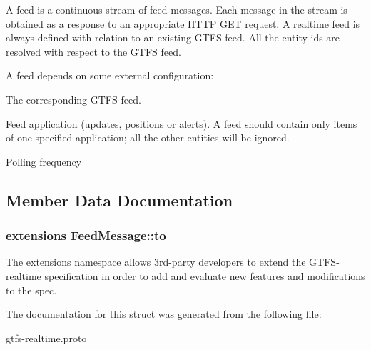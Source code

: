 A feed is a continuous stream of feed messages. Each message in the stream is obtained as a response to an appropriate H\+T\+TP G\+ET request. A realtime feed is always defined with relation to an existing G\+T\+FS feed. All the entity ids are resolved with respect to the G\+T\+FS feed.

A feed depends on some external configuration\+:
\begin{DoxyItemize}
\item The corresponding G\+T\+FS feed.
\item Feed application (updates, positions or alerts). A feed should contain only items of one specified application; all the other entities will be ignored.
\item Polling frequency 
\end{DoxyItemize}

\subsection{Member Data Documentation}
\subsubsection[{\texorpdfstring{to}{to}}]{\setlength{\rightskip}{0pt plus 5cm}extensions Feed\+Message\+::to}\hypertarget{structFeedMessage_a0c9c34fa06eec947bf51cf8b8d1ee0df}{}\label{structFeedMessage_a0c9c34fa06eec947bf51cf8b8d1ee0df}


The extensions namespace allows 3rd-\/party developers to extend the G\+T\+F\+S-\/realtime specification in order to add and evaluate new features and modifications to the spec. 



The documentation for this struct was generated from the following file\+:\begin{DoxyCompactItemize}
\item 
gtfs-\/realtime.\+proto\end{DoxyCompactItemize}
